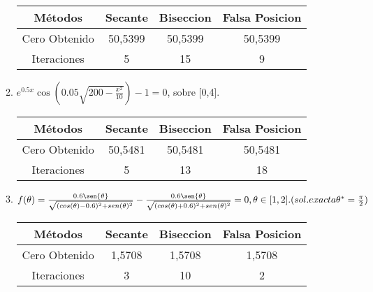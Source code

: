 \documentclass{udparticle}
\begin{document}
\begin{enumerate}
\begin{enumerate}
\begin{table}[H]
\begin{tabular} { |c|c|c|c|}
        \hline
        Métodos       & Secante & Biseccion & Falsa Posicion  \\
        \hline
        Cero Obtenido &  50,5399       &    50,5399       &      50,5399           \\
        \hline
        Iteraciones   &     5        &      15     &        9         \\
        \hline
        
        \end{tabular}
    \end{table}

\item \(e^{0.5x}\cos(0.05\sqrt{200-\frac{x^2}{10}}) -1 = 0 \), sobre [0,4].
    \begin{table}[H]
    \centering
        \begin{tabular} { |c|c|c|c|}
        
        \hline
        Métodos       & Secante & Biseccion & Falsa Posicion  \\
        \hline
        Cero Obtenido &  50,5481       &    50,5481       &      50,5481           \\
        \hline
        Iteraciones   &     5        &      13     &        18         \\
        \hline
        
        \end{tabular}
    \end{table}

\item $f (\theta) = \frac{0.6\sen{\theta}}{\sqrt{(cos(\theta) - 0.6)^2 + sen(\theta)^2}} -  \frac{0.6\sen{\theta}}{\sqrt{(cos(\theta) + 0.6)^2 + sen(\theta)^2}} = 0, \theta \in [1,2].
(sol. exacta \theta^* = \frac{\pi}{2})$ 

    \begin{table}[H]
    \centering
        \begin{tabular} { |c|c|c|c|}
        
        \hline
        Métodos       & Secante & Biseccion & Falsa Posicion  \\
        \hline
        Cero Obtenido &  1,5708       &   1,5708       &      1,5708           \\
        \hline
        Iteraciones   &     3        &      10     &        2         \\
        \hline
        
        \end{tabular}
    \end{table}
    

\end{enumerate}
\end{enumerate}
\end{document}

